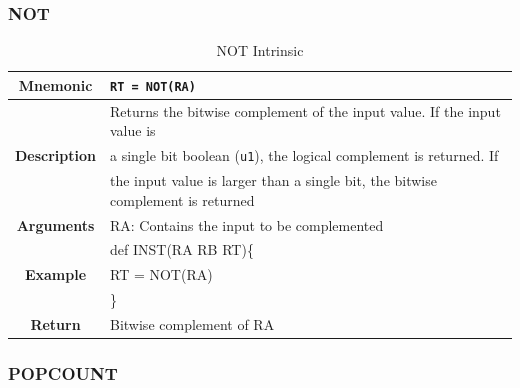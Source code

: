 \documentclass{article}
\begin{document}
\clearpage
\subsubsection{NOT}
\label{sec:NOT}

\begin{table}[h]
\begin{center}
\caption{NOT Intrinsic}
\vspace{0.125in}
\label{tab:NOTIntrinsic}
\begin{tabular}{|c|l|}
\hline
\textbf{Mnemonic} & \texttt{RT = NOT(RA)}\\
\hline
\multirow{3}{*}{\textbf{Description}} & Returns the bitwise complement of the input value.  If the input value is \\
						      & a single bit boolean (\texttt{u1}), the logical complement is returned.  If \\
						      & the input value is larger than a single bit, the bitwise complement is returned\\
\hline
\textbf{Arguments} & RA: Contains the input to be complemented\\
\hline
\multirow{3}{*}{\textbf{Example}} & def INST(RA RB RT)\{\\
                          			  &   RT = NOT(RA)\\
                                                    & \}\\
\hline
\textbf{Return} & Bitwise complement of RA\\                                                    
\hline
\end{tabular}
\end{center}
\end{table}

\clearpage
\subsubsection{POPCOUNT}
\label{sec:POPCOUNT}
\end{document}
